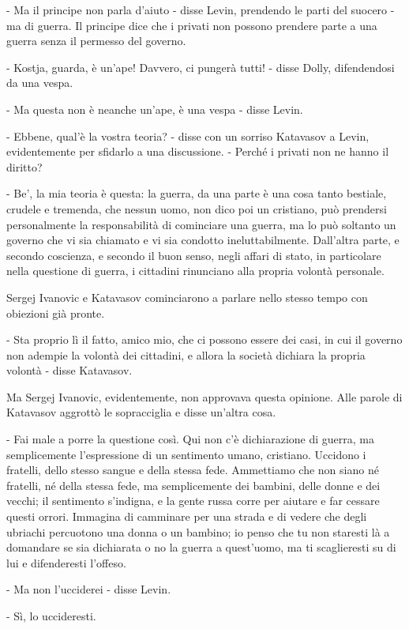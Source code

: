 - Ma il principe non parla d'aiuto - disse Levin, prendendo le parti del suocero - ma di guerra. Il principe dice che i privati non possono prendere parte a una guerra senza il permesso del governo. 

- Kostja, guarda, è un'ape! Davvero, ci pungerà tutti! - disse Dolly, difendendosi da una vespa. 

- Ma questa non è neanche un'ape, è una vespa - disse Levin. 

- Ebbene, qual'è la vostra teoria? - disse con un sorriso Katavasov a Levin, evidentemente per sfidarlo a una discussione. - Perché i privati non ne hanno il diritto? 

- Be', la mia teoria è questa: la guerra, da una parte è una cosa tanto bestiale, crudele e tremenda, che nessun uomo, non dico poi un cristiano, può prendersi personalmente la responsabilità di cominciare una guerra, ma lo può soltanto un governo che vi sia chiamato e vi sia condotto ineluttabilmente. Dall'altra parte, e secondo coscienza, e secondo il buon senso, negli affari di stato, in particolare nella questione di guerra, i cittadini rinunciano alla propria volontà personale. 

Sergej Ivanovic e Katavasov cominciarono a parlare nello stesso tempo con obiezioni già pronte. 

- Sta proprio lì il fatto, amico mio, che ci possono essere dei casi, in cui il governo non adempie la volontà dei cittadini, e allora la società dichiara la propria volontà - disse Katavasov. 

Ma Sergej Ivanovic, evidentemente, non approvava questa opinione. Alle parole di Katavasov aggrottò le sopracciglia e disse un'altra cosa. 

- Fai male a porre la questione così. Qui non c'è dichiarazione di guerra, ma semplicemente l'espressione di un sentimento umano, cristiano. Uccidono i fratelli, dello stesso sangue e della stessa fede. Ammettiamo che non siano né fratelli, né della stessa fede, ma semplicemente dei bambini, delle donne e dei vecchi; il sentimento s'indigna, e la gente russa corre per aiutare e far cessare questi orrori. Immagina di camminare per una strada e di vedere che degli ubriachi percuotono una donna o un bambino; io penso che tu non staresti là a domandare se sia dichiarata o no la guerra a quest'uomo, ma ti scaglieresti su di lui e difenderesti l'offeso. 

- Ma non l'ucciderei - disse Levin. 

- Sì, lo uccideresti. 

